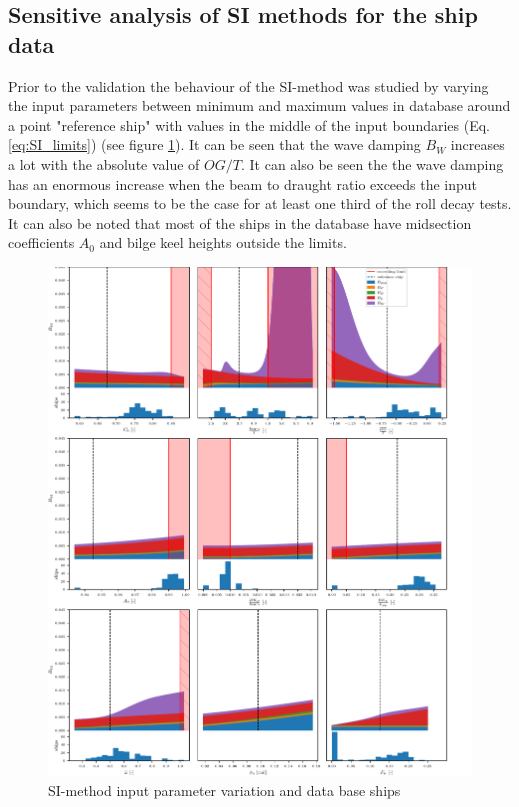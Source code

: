 \subsection{Sensitive analysis of SI methods for the ship data}
\label{se:accuracy_SI_method}
Prior to the validation the behaviour of the SI-method was studied by varying the input parameters between minimum and maximum values in database around a point "reference ship" with values in the middle of the input boundaries (Eq. \ref{eq:SI_limits}) (see figure \ref{fig:SI_sensitivity}). It can be seen that the wave damping $B_W$ increases a lot with the absolute value of $OG/T$. It can also be seen the the wave damping has an enormous increase when the beam to draught ratio exceeds the input boundary, which seems to be the case for at least one third of the roll decay tests. It can also be noted that most of the ships in the database have midsection coefficients $A_0$ and bilge keel heights outside the limits. 

\begin{figure}[H]
    \centering
    \includegraphics[width=\textwidth]{figures/SI-sensitivity.pdf}
        \vspace{-0.5cm}
    \caption{SI-method input parameter variation and data base ships}
    \label{fig:SI_sensitivity}
\end{figure}
